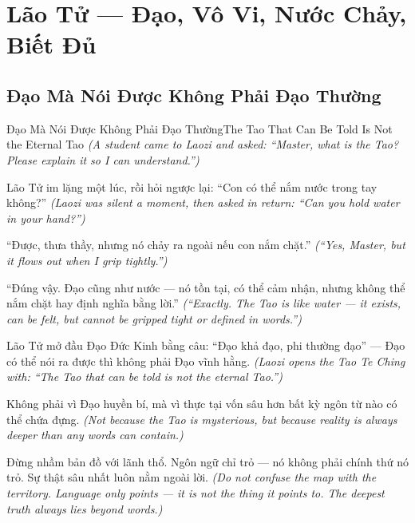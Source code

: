 \chapter{Lão Tử — Đạo, Vô Vi, Nước Chảy, Biết Đủ}

\section{Đạo Mà Nói Được Không Phải Đạo Thường}
\begin{truyen}{Đạo Mà Nói Được Không Phải Đạo Thường}{The Tao That Can Be Told Is Not the Eternal Tao}
\textit{(A student came to Laozi and asked: ``Master, what is the Tao? Please explain it so I can understand.'')}

Lão Tử im lặng một lúc, rồi hỏi ngược lại: ``Con có thể nắm nước trong tay không?''
\textit{(Laozi was silent a moment, then asked in return: ``Can you hold water in your hand?'')}

``Được, thưa thầy, nhưng nó chảy ra ngoài nếu con nắm chặt.''
\textit{(``Yes, Master, but it flows out when I grip tightly.'')}

``Đúng vậy. Đạo cũng như nước — nó tồn tại, có thể cảm nhận, nhưng không thể nắm chặt hay định nghĩa bằng lời.''
\textit{(``Exactly. The Tao is like water — it exists, can be felt, but cannot be gripped tight or defined in words.'')}

Lão Tử mở đầu Đạo Đức Kinh bằng câu: ``Đạo khả đạo, phi thường đạo'' — Đạo có thể nói ra được thì không phải Đạo vĩnh hằng.
\textit{(Laozi opens the Tao Te Ching with: ``The Tao that can be told is not the eternal Tao.'')}

Không phải vì Đạo huyền bí, mà vì thực tại vốn sâu hơn bất kỳ ngôn từ nào có thể chứa đựng.
\textit{(Not because the Tao is mysterious, but because reality is always deeper than any words can contain.)}

\end{truyen}

\begin{baihoc}
Đừng nhầm bản đồ với lãnh thổ. Ngôn ngữ chỉ trỏ — nó không phải chính thứ nó trỏ. Sự thật sâu nhất luôn nằm ngoài lời.
\textit{(Do not confuse the map with the territory. Language only points — it is not the thing it points to. The deepest truth always lies beyond words.)}
\end{baihoc}
\ngancach

